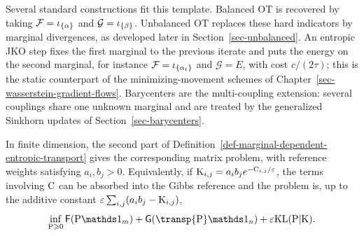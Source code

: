 Several standard constructions fit this template. Balanced OT is recovered by taking $\mathcal F=\iota_{\{\alpha\}}$ and $\mathcal G=\iota_{\{\beta\}}$. Unbalanced OT replaces these hard indicators by marginal divergences, as developed later in Section~\ref{sec-unbalanced}. An entropic JKO step fixes the first marginal to the previous iterate and puts the energy on the second marginal, for instance $\mathcal F=\iota_{\{\alpha_t\}}$ and $\mathcal G=E$, with cost $c/(2\tau)$; this is the static counterpart of the minimizing-movement schemes of Chapter~\ref{sec-wasserstein-gradient-flows}. Barycenters are the multi-coupling extension: several couplings share one unknown marginal and are treated by the generalized Sinkhorn updates of Section~\ref{sec-barycenters}.

In finite dimension, the second part of Definition~\ref{def-marginal-dependent-entropic-transport} gives the corresponding matrix problem, with reference weights satisfying $a_i,b_j>0$.
Equivalently, if $\mathrm{K}_{i,j}=a_i b_j e^{-\mathrm{C}_{i,j}/\varepsilon}$, the terms involving $\mathrm{C}$ can be absorbed into the Gibbs reference and the problem is, up to the additive constant $\varepsilon\sum_{i,j}(a_i b_j-\mathrm{K}_{i,j})$,
\[
	\inf_{\P\geq0}
	\mathsf F(\P\ones_m)
	+
	\mathsf G(\transp{\P}\ones_n)
	+
	\epsilon\KLD(\P|\K).
\]

